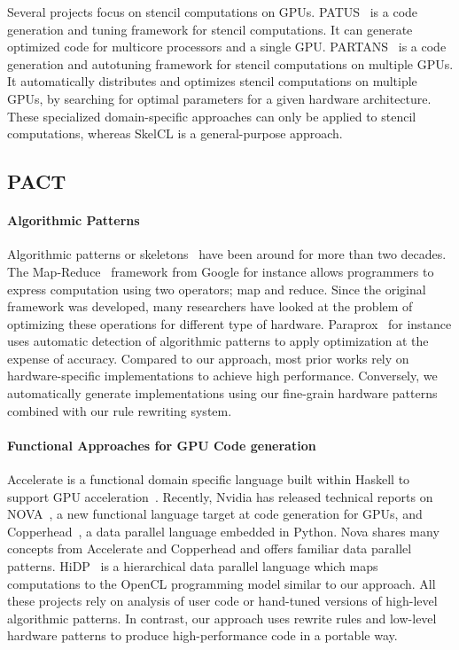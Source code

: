 Several projects focus on stencil computations on GPUs.
PATUS~\cite{PATUS} is a code generation and tuning framework for stencil computations.
It can generate optimized code for multicore processors and a single GPU.
PARTANS~\cite{PARTANS} is a code generation and autotuning framework for stencil computations on multiple GPUs. 
It automatically distributes and optimizes stencil computations on multiple GPUs, by searching for optimal parameters for a given hardware architecture.
These specialized domain-specific approaches can only be applied to stencil computations, whereas SkelCL is a general-purpose approach.


\subsection{PACT}

\paragraph{Algorithmic Patterns}
Algorithmic patterns or skeletons~\cite{cole88skeleton} have been around for more than two decades.
The Map-Reduce~\cite{dean08mapreduce} framework from Google for instance allows programmers to express computation using two operators; map and reduce.
Since the original framework was developed, many researchers have looked at the problem of optimizing these operations for different type of hardware.
Paraprox~\cite{Samadi14Paraprox} for instance uses automatic detection of algorithmic patterns to apply optimization at the expense of accuracy.
Compared to our approach, most prior works rely on hardware-specific implementations to achieve high performance.
Conversely, we automatically generate implementations using our fine-grain hardware patterns combined with our rule rewriting system.

\paragraph{Functional Approaches for GPU Code generation}
Accelerate is a functional domain specific language built within Haskell to support GPU acceleration~\cite{chakravarty11accelerating,mcdonell13optimising}.
Recently, Nvidia has released technical reports on NOVA~\cite{collins13nova}, a new functional language target at code generation for GPUs, and Copperhead~\cite{catanzaro11copperhead}, a data parallel language embedded in Python.
Nova shares many concepts from Accelerate and Copperhead and offers familiar data parallel patterns.
HiDP~\cite{zhang13hidp} is a hierarchical data parallel language which maps computations to the OpenCL programming model similar to our approach.
All these projects rely on analysis of user code or hand-tuned versions of high-level algorithmic patterns.
In contrast, our approach uses rewrite rules and low-level hardware patterns to produce high-performance code in a portable way.

